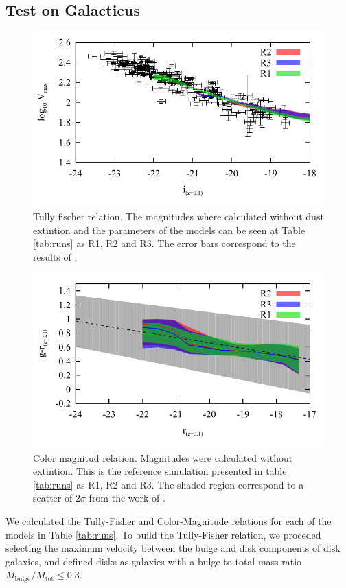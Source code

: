 \documentclass[usenatbib]{mn2e}
\begin{document}
\subsection{Test on Galacticus}
\begin{figure}
\centering
 \includegraphics[scale=0.68]{figures/tests/T_F-disk-velmax.pdf}
\caption{ Tully fischer relation. The magnitudes where calculated without dust extintion and the parameters of the models can be seen at Table \ref{tab:runs} 
 as R1, R2 and R3. The error bars correspond to the results of \citet{2007AJ....134..945P}.\label{fig:T-F-diagram}}
\end{figure}
\begin{figure}
\centering
 \includegraphics[scale=0.68]{figures/tests/Color_Mag.pdf}
\caption{ Color magnitud relation. Magnitudes were calculated without extintion. This is the reference simulation presented in table \ref{tab:runs}  as 
R1, R2 and R3. The shaded region correspond to a scatter of  $2\sigma$ from the work  of \citet{2012MNRAS.423.1583M}.\label{fig:CM-diagram}}
\end{figure}
We calculated the Tully-Fisher and Color-Magnitude relations for each of the models in Table \ref{tab:runs}.  
To build the Tully-Fisher relation, we proceded selecting the maximum velocity between the  bulge and disk components of disk galaxies, and defined
 disks as galaxies  with a bulge-to-total mass ratio $M_{\text{bulge}}/M_{\text{tot}}\le 0.3$. 
\end{document}
